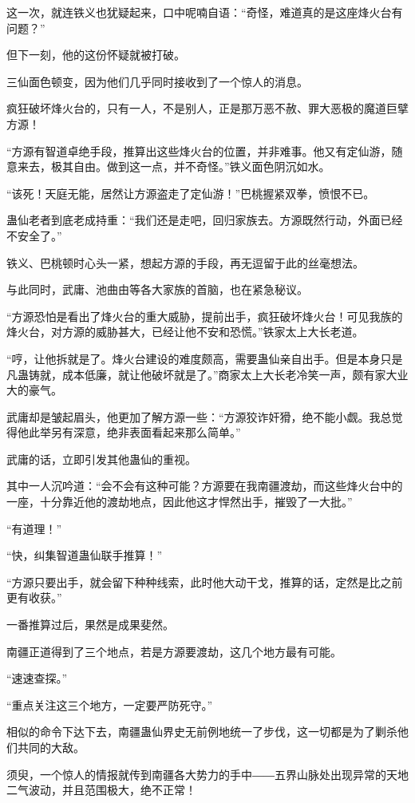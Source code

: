 \begin{this_body}
这一次，就连铁义也犹疑起来，口中呢喃自语：“奇怪，难道真的是这座烽火台有问题？”

但下一刻，他的这份怀疑就被打破。

三仙面色顿变，因为他们几乎同时接收到了一个惊人的消息。

疯狂破坏烽火台的，只有一人，不是别人，正是那万恶不赦、罪大恶极的魔道巨擘方源！

“方源有智道卓绝手段，推算出这些烽火台的位置，并非难事。他又有定仙游，随意来去，极其自由。做到这一点，并不奇怪。”铁义面色阴沉如水。

“该死！天庭无能，居然让方源盗走了定仙游！”巴桃握紧双拳，愤恨不已。

蛊仙老者到底老成持重：“我们还是走吧，回归家族去。方源既然行动，外面已经不安全了。”

铁义、巴桃顿时心头一紧，想起方源的手段，再无逗留于此的丝毫想法。

与此同时，武庸、池曲由等各大家族的首脑，也在紧急秘议。

“方源恐怕是看出了烽火台的重大威胁，提前出手，疯狂破坏烽火台！可见我族的烽火台，对方源的威胁甚大，已经让他不安和恐慌。”铁家太上大长老道。

“哼，让他拆就是了。烽火台建设的难度颇高，需要蛊仙亲自出手。但是本身只是凡蛊铸就，成本低廉，就让他破坏就是了。”商家太上大长老冷笑一声，颇有家大业大的豪气。

武庸却是皱起眉头，他更加了解方源一些：“方源狡诈奸猾，绝不能小觑。我总觉得他此举另有深意，绝非表面看起来那么简单。”

武庸的话，立即引发其他蛊仙的重视。

其中一人沉吟道：“会不会有这种可能？方源要在我南疆渡劫，而这些烽火台中的一座，十分靠近他的渡劫地点，因此他这才悍然出手，摧毁了一大批。”

“有道理！”

“快，纠集智道蛊仙联手推算！”

“方源只要出手，就会留下种种线索，此时他大动干戈，推算的话，定然是比之前更有收获。”

一番推算过后，果然是成果斐然。

南疆正道得到了三个地点，若是方源要渡劫，这几个地方最有可能。

“速速查探。”

“重点关注这三个地方，一定要严防死守。”

相似的命令下达下去，南疆蛊仙界史无前例地统一了步伐，这一切都是为了剿杀他们共同的大敌。

须臾，一个惊人的情报就传到南疆各大势力的手中――五界山脉处出现异常的天地二气波动，并且范围极大，绝不正常！

\end{this_body}

